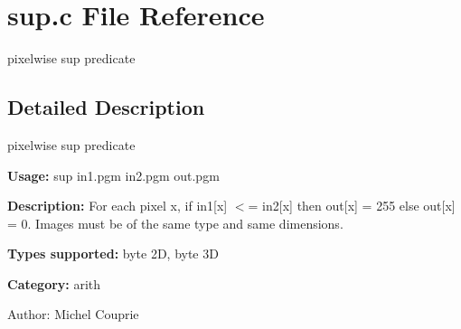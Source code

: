 \section{sup.c File Reference}
\label{sup_8c}
pixelwise sup predicate 



\subsection{Detailed Description}
pixelwise sup predicate 

{\bf Usage:} sup in1.pgm in2.pgm out.pgm

{\bf Description:} For each pixel x, if in1[x] $<$= in2[x] then out[x] = 255 else out[x] = 0. Images must be of the same type and same dimensions.

{\bf Types supported:} byte 2D, byte 3D

{\bf Category:} arith

\begin{Desc}
\item[Author:]Michel Couprie \end{Desc}
